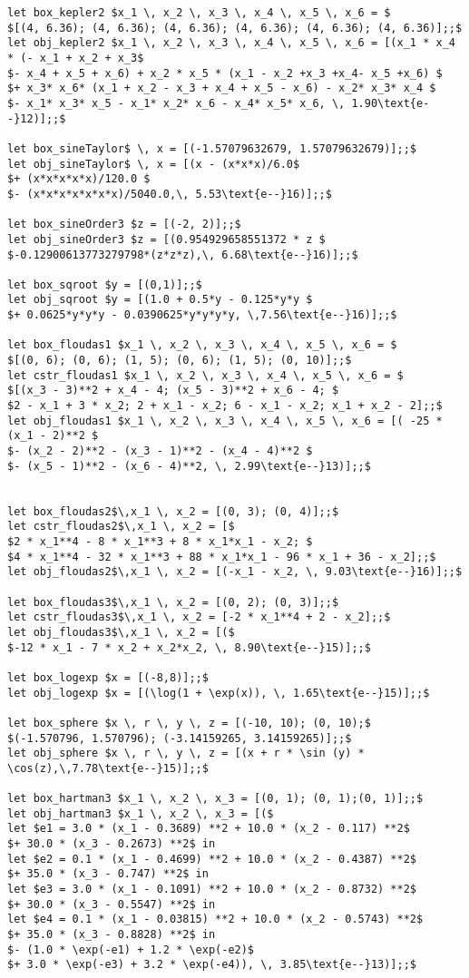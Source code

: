 {\begin{lstlisting}
let box_kepler2 $x_1 \, x_2 \, x_3 \, x_4 \, x_5 \, x_6 = $
$[(4, 6.36); (4, 6.36); (4, 6.36); (4, 6.36); (4, 6.36); (4, 6.36)];;$
let obj_kepler2 $x_1 \, x_2 \, x_3 \, x_4 \, x_5 \, x_6 = [(x_1 * x_4 * (- x_1 + x_2 + x_3$
$- x_4 + x_5 + x_6) + x_2 * x_5 * (x_1 - x_2 +x_3 +x_4- x_5 +x_6) $
$+ x_3* x_6* (x_1 + x_2 - x_3 + x_4 + x_5 - x_6) - x_2* x_3* x_4 $
$- x_1* x_3* x_5 - x_1* x_2* x_6 - x_4* x_5* x_6, \, 1.90\text{e--}12)];;$

let box_sineTaylor$ \, x = [(-1.57079632679, 1.57079632679)];;$
let obj_sineTaylor$ \, x = [(x - (x*x*x)/6.0$
$+ (x*x*x*x*x)/120.0 $
$- (x*x*x*x*x*x*x)/5040.0,\, 5.53\text{e--}16)];;$

let box_sineOrder3 $z = [(-2, 2)];;$
let obj_sineOrder3 $z = [(0.954929658551372 * z $
$-0.12900613773279798*(z*z*z),\, 6.68\text{e--}16)];;$

let box_sqroot $y = [(0,1)];;$
let obj_sqroot $y = [(1.0 + 0.5*y - 0.125*y*y $
$+ 0.0625*y*y*y - 0.0390625*y*y*y*y, \,7.56\text{e--}16)];;$

let box_floudas1 $x_1 \, x_2 \, x_3 \, x_4 \, x_5 \, x_6 = $
$[(0, 6); (0, 6); (1, 5); (0, 6); (1, 5); (0, 10)];;$
let cstr_floudas1 $x_1 \, x_2 \, x_3 \, x_4 \, x_5 \, x_6 = $
$[(x_3 - 3)**2 + x_4 - 4; (x_5 - 3)**2 + x_6 - 4; $
$2 - x_1 + 3 * x_2; 2 + x_1 - x_2; 6 - x_1 - x_2; x_1 + x_2 - 2];;$
let obj_floudas1 $x_1 \, x_2 \, x_3 \, x_4 \, x_5 \, x_6 = [( -25 * (x_1 - 2)**2 $
$- (x_2 - 2)**2 - (x_3 - 1)**2 - (x_4 - 4)**2 $
$- (x_5 - 1)**2 - (x_6 - 4)**2, \, 2.99\text{e--}13)];;$


let box_floudas2$\,x_1 \, x_2 = [(0, 3); (0, 4)];;$
let cstr_floudas2$\,x_1 \, x_2 = [$
$2 * x_1**4 - 8 * x_1**3 + 8 * x_1*x_1 - x_2; $
$4 * x_1**4 - 32 * x_1**3 + 88 * x_1*x_1 - 96 * x_1 + 36 - x_2];;$
let obj_floudas2$\,x_1 \, x_2 = [(-x_1 - x_2, \, 9.03\text{e--}16)];;$

let box_floudas3$\,x_1 \, x_2 = [(0, 2); (0, 3)];;$
let cstr_floudas3$\,x_1 \, x_2 = [-2 * x_1**4 + 2 - x_2];;$
let obj_floudas3$\,x_1 \, x_2 = [($
$-12 * x_1 - 7 * x_2 + x_2*x_2, \, 8.90\text{e--}15)];;$

let box_logexp $x = [(-8,8)];;$
let obj_logexp $x = [(\log(1 + \exp(x)), \, 1.65\text{e--}15)];;$

let box_sphere $x \, r \, y \, z = [(-10, 10); (0, 10);$
$(-1.570796, 1.570796); (-3.14159265, 3.14159265)];;$
let obj_sphere $x \, r \, y \, z = [(x + r * \sin (y) * \cos(z),\,7.78\text{e--}15)];;$

let box_hartman3 $x_1 \, x_2 \, x_3 = [(0, 1); (0, 1);(0, 1)];;$
let obj_hartman3 $x_1 \, x_2 \, x_3 = [($
let $e1 = 3.0 * (x_1 - 0.3689) **2 + 10.0 * (x_2 - 0.117) **2$
$+ 30.0 * (x_3 - 0.2673) **2$ in
let $e2 = 0.1 * (x_1 - 0.4699) **2 + 10.0 * (x_2 - 0.4387) **2$
$+ 35.0 * (x_3 - 0.747) **2$ in
let $e3 = 3.0 * (x_1 - 0.1091) **2 + 10.0 * (x_2 - 0.8732) **2$
$+ 30.0 * (x_3 - 0.5547) **2$ in
let $e4 = 0.1 * (x_1 - 0.03815) **2 + 10.0 * (x_2 - 0.5743) **2$
$+ 35.0 * (x_3 - 0.8828) **2$ in
$- (1.0 * \exp(-e1) + 1.2 * \exp(-e2)$
$+ 3.0 * \exp(-e3) + 3.2 * \exp(-e4)), \, 3.85\text{e--}13)];;$


\end{lstlisting}}

